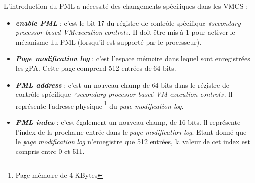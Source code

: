 \par\noindent L'introduction du PML a nécessité des changements spécifiques dans les \acs{VMCS}
 : 
\begin{itemize}
    \item \textit{\textbf{enable PML}} : c'est le bit 17 du régistre de contrôle spécifique \textit{«secondary processor-based VMexecution control»}. Il doit être mis à 1 pour activer le mécanisme du PML (lorsqu'il est supporté par le processeur).
    \item \textit{\textbf{Page modification log}} : c'est l'espace mémoire dans lequel sont enregistrées les \acs{gPA}. Cette page comprend 512 entrées de 64 bits.
    \item \textit{\textbf{PML address}} : c'est un nouveau champ de 64 bits dans le régistre de contrôle spécifique \textit{«secondary processor-based VM execution control»}. Il représente l'adresse physique \footnote{Page mémoire de 4-KBytes} du \textit{page modification log}.
    \item \textit{\textbf{PML index}} : c'est également un nouveau champ, de 16 bits. Il représente l'index de la prochaine entrée dans le \textit{page modification log}. Etant donné que le \textit{page modification log} n'enregistre que 512 entrées, la valeur de cet index est compris entre 0 et 511.
\end{itemize}
